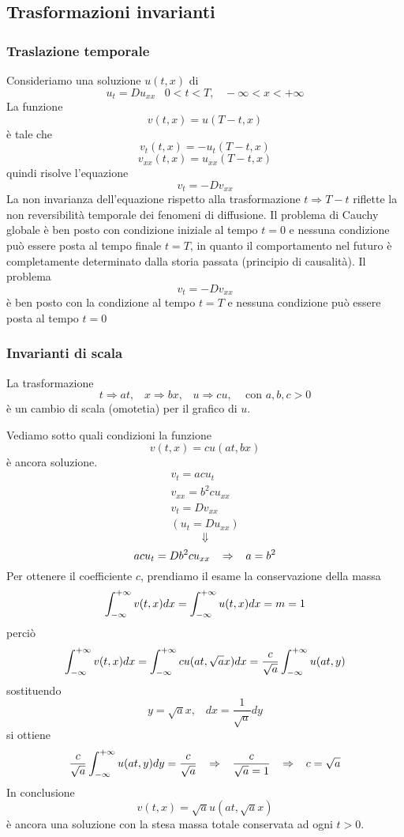 \subsection{Trasformazioni invarianti}
\subsubsection{Traslazione temporale}
Consideriamo una soluzione $u(t,x)$ di 
\[
	u_t= Du_{xx} \;\;\; 0< t< T, \;\;\; - \infty <x < +\infty
\]
La funzione
\[
	v(t,x)= u(T-t,x)
\]
\`e tale che 
\[
	v_t(t,x)= -u_t(T-t, x)
\]
\[
	v_{xx}(t, x)= u_{xx}(T-t,x)
\]
quindi risolve l'equazione
\[
	v_t= -Dv_{xx}
\]
La non invarianza dell'equazione rispetto alla trasformazione $t \Rightarrow T-t$
riflette la non reversibilit\`a temporale dei fenomeni di diffusione.
Il problema di Cauchy globale \`e ben posto con condizione iniziale al tempo 
$t=0$ e nessuna condizione pu\`o essere posta al tempo finale $t=T$, in quanto il comportamento nel futuro \`e completamente determinato dalla storia passata
(principio di causalit\`a).
Il problema 
\[
	v_t= -Dv_{xx}
\]
\`e ben posto con la condizione al tempo $t=T$ e nessuna condizione pu\`o essere posta al tempo $t=0$
\subsubsection{Invarianti di scala}
La trasformazione
\[
	t\Rightarrow at, \;\;\; x \Rightarrow bx, \;\;\; u\Rightarrow cu,
	\;\;\;
	\text{ con }
	a,b,c>0
\]
\`e un cambio di scala (omotetia) per il grafico di $u$.

Vediamo sotto quali condizioni la funzione
\[
	v(t,x)= cu(at, bx)
\]
\`e ancora soluzione.
\[
	\begin{array}{l}
		v_t= acu_t \\
		v_{xx}= b^2 c u_{xx}  \\
		v_t= Dv_{xx} \\
		\left( u_t= Du_{xx} \right)
	\end{array}
\]
\[
	\Downarrow
\]
\[
	acu_t= Db^2 c u_{xx} \;\;\; \Rightarrow \;\;\; a=b^2
\]
Per ottenere il coefficiente $c$, prendiamo il esame la conservazione della 
massa
\[
	\int_{- \infty}^{+ \infty} v(t,x) dx = \int_{- \infty}^{+ \infty} u(t,x) dx = m= 1
\]
perci\`o
\[
	\int_{- \infty}^{+ \infty} v(t,x) dx=
	\int_{- \infty}^{+ \infty} cu(at, \sqrt{a}x) dx= \frac{c}{\sqrt{a}}
	\int_{- \infty}^{+ \infty} u(at,y)
\]
sostituendo
\[
	y=\sqrt{a}x, \;\;\; dx= \frac{1}{\sqrt{a}}dy
\]
si ottiene
\[
	\frac{c}{\sqrt{a}}
	\int_{- \infty}^{+ \infty} u(at,y)dy= \frac{c}{\sqrt{a}}
	\;\;\; \Rightarrow \;\;\;
	\frac{c}{\sqrt{a}=1}
	\;\;\; \Rightarrow \;\;\;
	c=\sqrt{a}
\]
In conclusione
\[
	v(t,x)= \sqrt{a}u(at, \sqrt{a}x)
\]
\`e ancora una soluzione con la stesa massa totale conservata ad ogni $t>0$.

